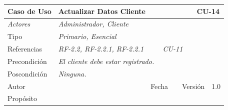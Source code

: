 \begin{table}[H]
    \begin{tabular}{|llllllll|}
    \hline
    \multicolumn{1}{|l|}{\cellcolor[HTML]{F2F2F2}Caso de Uso}           & \multicolumn{5}{l|}{Actualizar Datos Cliente}                                                                       & \multicolumn{2}{l|}{\cellcolor[HTML]{E6E6E6}CU-14}             \\ \hline
    \multicolumn{1}{|l|}{{\color[HTML]{808080} \textit{Actores}}}       & \multicolumn{7}{l|}{{\color[HTML]{808080} \textit{Administrador, Cliente}}}                                                                                                      \\ \hline
    \multicolumn{1}{|l|}{Tipo}                                          & \multicolumn{7}{l|}{{\color[HTML]{808080} \textit{Primario, Esencial}}}                                                                                                                           \\ \hline
    \multicolumn{1}{|l|}{Referencias}                                   & \multicolumn{2}{l|}{{\color[HTML]{808080} \textit{RF-2.2, RF-2.2.1, RF-2.2.1}}}                & \multicolumn{5}{l|}{{\color[HTML]{808080} \textit{CU-11}}}                                                                                                \\ \hline
    \multicolumn{1}{|l|}{Precondici\'on}                                  & \multicolumn{7}{l|}{{\color[HTML]{808080} \textit{El cliente debe estar registrado.}}}                                                                                                      \\ \hline
    \multicolumn{1}{|l|}{Poscondici\'on}                                  & \multicolumn{7}{l|}{{\color[HTML]{808080} \textit{Ninguna.}}}                                                                                                                                                                             \\ \hline
    \multicolumn{1}{|l|}{Autor}                                         & \multicolumn{1}{l|}{}                         & \multicolumn{2}{l|}{Fecha}             & \multicolumn{1}{l|}{}        & \multicolumn{2}{l|}{Versi\'on}             & 1.0                            \\ \hline
    \multicolumn{8}{|l|}{Prop\'osito}                                                                                                                                                                                                                                         \\ \hline

\end{tabular}
\end{table}
